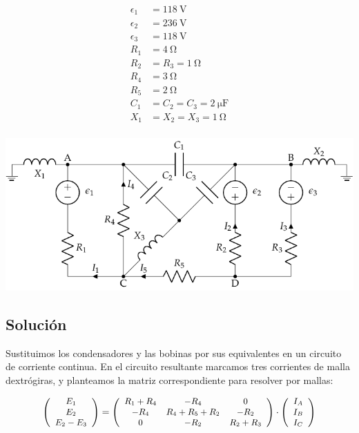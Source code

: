\documentclass[10pt]{article}
\begin{document}
\begin{minipage}[c]{0.3\linewidth}
  \begin{align*}
    \epsilon_{1}&=\SI{118}{\volt}\\
    \epsilon_{2}&=\SI{236}{\volt}\\
    \epsilon_{3}&=\SI{118}{\volt}\\
    R_{1}&= \SI{4}{\ohm}\\
    R_{2}&=R_{3}=\SI{1}{\ohm}\\
    R_{4}&= \SI{3}{\ohm}\\
    R_{5}&= \SI{2}{\ohm}\\
    C_{1}&=C_{2}=C_{3}=\SI{2}{\micro\farad}\\
    X_1 &= X_2 = X_3 = \SI{1}{\ohm}\\
  \end{align*}
\end{minipage}
\begin{minipage}[c]{0.7\linewidth}
  \includegraphics{figs/mallas_condensadores.pdf}
\end{minipage}

\subsection*{Solución}
Sustituimos los condensadores y las bobinas por sus equivalentes en un circuito de corriente continua. En el circuito resultante marcamos tres corrientes de malla dextrógiras, y planteamos la matriz correspondiente para resolver por mallas: 

\[
\small{
\left(\begin{array}{c}
    E_1\\
    E_2\\
    E_2 - E_3
  \end{array}\right) = \left(\begin{array}{ccc}
    R_1 + R_4 & -R_4 & 0\\
    -R_4 & R_4 + R_5 + R_2 & -R_{2}\\
    0 & -R_2 & R_2 + R_3
  \end{array}\right) \cdot \left(\begin{array}{c}
    I_{A}\\
    I_{B}\\
    I_{C}
  \end{array}\right)
}
\]
\end{document}
